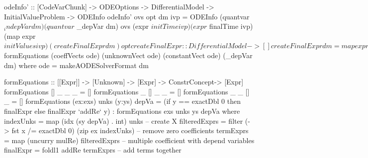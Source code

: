 \begin{listing}[ht]
\begin{haskell1}
odeInfo' :: [CodeVarChunk] -> ODEOptions -> DifferentialModel -> InitialValueProblem -> ODEInfo
odeInfo' ovs opt dm ivp = ODEInfo 
  (quantvar $ _indepVar dm) 
  (quantvar $ _depVar dm) 
  ovs 
  (expr $ initTime ivp)
  (expr $ finalTime ivp)
  (map expr $ initValues ivp)
  (createFinalExpr dm)
  opt

createFinalExpr :: DifferentialModel -> []
createFinalExpr dm = map expr $ formEquations (coeffVects ode) (unknownVect ode) (constantVect ode) (_depVar dm)
  where ode = makeAODESolverFormat dm

formEquations :: [[Expr]] -> [Unknown] -> [Expr] -> ConstrConcept-> [Expr]
formEquations [] _ _ _ = []
formEquations _ [] _ _ = []
formEquations _ _ [] _ = []
formEquations (ex:exs) unks (y:ys) depVa =
  (if y == exactDbl 0 then finalExpr else finalExpr `addRe` y) : formEquations exs unks ys depVa
  where indexUnks = map (idx (sy depVa) . int) unks -- create X
        filteredExprs = filter (\x -> fst x /= exactDbl 0) (zip ex indexUnks) -- remove zero coefficients
        termExprs = map (uncurry mulRe) filteredExprs -- multiple coefficient with depend variables
        finalExpr = foldl1 addRe termExprs -- add terms together
\end{haskell1}
\label{code_generateodeinfo}
\end{listing}
